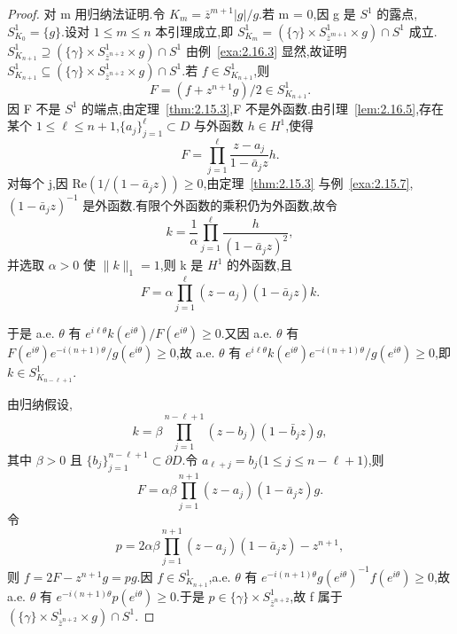 \begin{proof}
对 m 用归纳法证明.令 $K_{m} = \overline{z}^{m+1}|g|/g$.若 m = 0,因 g 是 $S^{1}$ 的露点,$S_{K_{0}}^{1} = \{g\}$.设对 $1 \leq m \leq n$ 本引理成立,即 $S_{K_{m}}^{1} = (\{\gamma\} \times S_{\bar{z}^{m+1}}^{1} \times g) \cap S^{1}$ 成立.$S_{K_{n+1}}^{1} \supseteq (\{\gamma\} \times S_{\bar{z}^{n+2}}^{1} \times g) \cap S^{1}$ 由例~\ref{exa:2.16.3} 显然,故证明 $S_{K_{n+1}}^{1} \subseteq (\{\gamma\} \times S_{\bar{z}^{n+2}}^{1} \times g) \cap S^{1}$.若 $f \in S_{K_{n+1}}^{1}$,则
\begin{equation*}
F = (f + z^{n+1}g)/2 \in S_{K_{n+1}}^{1}.
\end{equation*}
因 F 不是 $S^{1}$ 的端点,由定理~\ref{thm:2.15.3},F 不是外函数.由引理~\ref{lem:2.16.5},存在某个 $1 \leq \ell \leq n+1$,$\{a_{j}\}_{j=1}^{\ell} \subset D$ 与外函数 $h \in H^{1}$,使得
\begin{equation*}
F = \prod_{j=1}^{\ell} \frac{z - a_{j}}{1 - \bar{a}_{j}z} h.
\end{equation*}
对每个 j,因 $\mathrm{Re}(1/(1-\bar{a}_{j}z)) \geq 0$,由定理~\ref{thm:2.15.3} 与例~\ref{exa:2.15.7},$(1-\bar{a}_{j}z)^{-1}$ 是外函数.有限个外函数的乘积仍为外函数,故令
\begin{equation*}
k = \frac{1}{\alpha}\prod_{j=1}^{\ell} \frac{h}{(1 - \bar{a}_{j}z)^{2}},
\end{equation*}
并选取 $\alpha > 0$ 使 $\|k\|_{1} = 1$,则 k 是 $H^{1}$ 的外函数,且
\begin{equation*}
F = \alpha \prod_{j=1}^{\ell} (z - a_{j})(1 - \bar{a}_{j}z) k.
\end{equation*}
\begin{sloppypar}
于是 a.e. $\theta$ 有 $e^{i\ell\theta}k(e^{i\theta})/F(e^{i\theta}) \geq 0$.又因 a.e. $\theta$ 有 $F(e^{i\theta})e^{-i(n+1)\theta}/g(e^{i\theta}) \geq 0$,故 a.e. $\theta$ 有 $e^{i\ell\theta}k(e^{i\theta})e^{-i(n+1)\theta}/g(e^{i\theta}) \geq 0$,即 $k \in S_{K_{n-\ell+1}}^{1}$.
\end{sloppypar}由归纳假设,
\begin{equation*}
k = \beta \prod_{j=1}^{n-\ell+1} (z - b_{j})(1 - \bar{b}_{j}z) g,
\end{equation*}
其中 $\beta > 0$ 且 $\{b_{j}\}_{j=1}^{n-\ell+1} \subset \partial D$.令 $a_{\ell+j} = b_{j}$($1 \leq j \leq n - \ell + 1$),则
\begin{equation*}
F = \alpha\beta \prod_{j=1}^{n+1} (z - a_{j})(1 - \bar{a}_{j}z) g.
\end{equation*}
令
\begin{equation*}
p = 2\alpha\beta \prod_{j=1}^{n+1} (z - a_{j})(1 - \bar{a}_{j}z) - z^{n+1},
\end{equation*}
则 $f = 2F - z^{n+1}g = pg$.因 $f \in S_{K_{n+1}}^{1}$,a.e. $\theta$ 有 $e^{-i(n+1)\theta}g(e^{i\theta})^{-1}f(e^{i\theta}) \geq 0$,故 a.e. $\theta$ 有 $e^{-i(n+1)\theta}p(e^{i\theta}) \geq 0$.于是 $p \in \{\gamma\} \times S_{\bar{z}^{n+2}}^{1}$,故 f 属于 $(\{\gamma\} \times S_{\bar{z}^{n+2}}^{1} \times g) \cap S^{1}$.
\end{proof}

